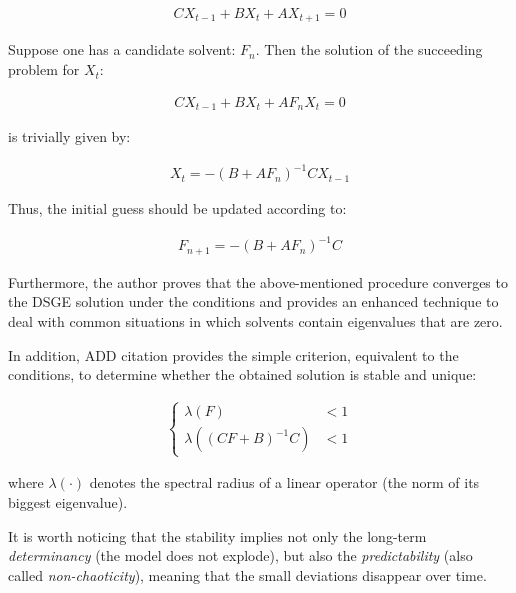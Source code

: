 \documentclass{pracamgr}
\numberwithin{equation}{section}
\begin{document}
\begin{align}
CX_{t-1} + BX_{t} + AX_{t+1}  = 0
\end{align}

Suppose one has a candidate solvent: $F_{n}$. Then the solution of the succeeding problem for $X_{t}$:

\begin{align}
CX_{t-1} + BX_{t} + AF_{n}X_{t}  = 0
\end{align}

is trivially given by:

\begin{align}
X_{t} = -\left( B + AF_{n} \right)^{-1} CX_{t-1}
\end{align}

Thus, the initial guess should be updated according to:

\begin{align}
F_{n+1} = -\left( B + AF_{n} \right)^{-1} C
\end{align}

Furthermore, the author proves that the above-mentioned procedure converges to the DSGE solution under the \citet{blanchard1980solution} conditions and provides an enhanced technique to deal with common situations in which solvents contain eigenvalues that are zero.

In addition, {\color{red} ADD citation} provides the simple criterion, equivalent to the  \citet{blanchard1980solution} conditions, to determine whether the obtained solution is stable and unique:

\begin{align}
\left\{
\begin{array}{cl}
\lambda(F) &< 1 \nonumber \\
\lambda \left( \left(CF + B \right)^{-1} C \right) &< 1 
\end{array}
\right.
\end{align}

where $\lambda(\cdot)$ denotes the spectral radius of a linear operator (the norm of its biggest eigenvalue).

It is worth noticing that the stability implies not only the long-term \textit{determinancy} (the model does not explode), but also the \textit{predictability} (also called \textit{non-chaoticity}), meaning that the small deviations disappear over time.
\end{document}
